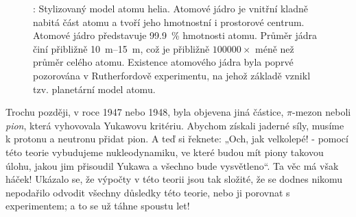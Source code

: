     \begin{figure}[hbt!]  %
      \centering
      \caption{ \wikiAtomJadro: Stylizovaný model atomu helia. Atomové jádro je vnitřní kladně
                nabitá část atomu a tvoří jeho hmotnostní i prostorové centrum. Atomové jádro
                představuje \SI{99.9}{\percent} hmotnosti atomu. Průměr jádra činí přibližně
                \SIrange{10}{15}{\m}, což je přibližně \(\num{100 000}\times\) méně než průměr
                celého atomu. Existence atomového jádra byla poprvé pozorována v Rutherfordově
                experimentu, na jehož základě vznikl tzv. planetární model atomu.}
      \label{fyz:fig895}
    \end{figure} 
    
    Trochu později, v roce 1947 nebo 1948, byla objevena jiná částice, \(\pi\text{-mezon}\) neboli 
    \emph{pion}, která vyhovovala Yukawovu kritériu. Abychom získali jaderné síly, musíme k protonu 
    a neutronu přidat pion. A teď si řeknete: „Och, jak velkolepé! - pomocí této teorie vybudujeme 
    nukleodynamiku, ve které budou mít piony takovou úlohu, jakou jim přisoudil Yukawa a všechno 
    bude vysvětleno“. Ta věc má však háček! Ukázalo se, že výpočty v této teorii jsou tak složité, 
    že se dodnes nikomu nepodařilo odvodit všechny důsledky této teorie, nebo ji porovnat s 
    experimentem; a to se už táhne spoustu let!
    
